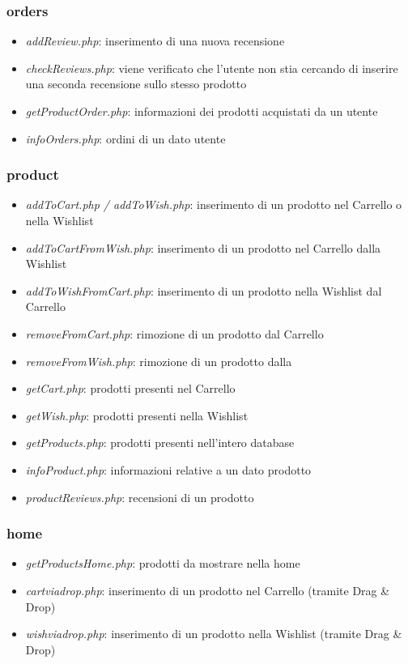 \documentclass[14pt]{extarticle}
\begin{document}
\subsubsection*{orders}
\begin{itemize}
    \item \textit{addReview.php}: inserimento di una nuova recensione
    \item \textit{checkReviews.php}: viene verificato che l'utente non stia cercando di inserire una seconda
    recensione sullo stesso prodotto
    \item \textit{getProductOrder.php}: informazioni dei prodotti acquistati da un utente
    \item \textit{infoOrders.php}: ordini di un dato utente
\end{itemize}

\subsubsection*{product}
\begin{itemize}
    \item \textit{addToCart.php / addToWish.php}: inserimento di un prodotto nel Carrello o nella Wishlist
    \item \textit{addToCartFromWish.php}: inserimento di un prodotto nel Carrello dalla Wishlist
    \item \textit{addToWishFromCart.php}: inserimento di un prodotto nella Wishlist dal Carrello
    \item \textit{removeFromCart.php}: rimozione di un prodotto dal Carrello
    \item \textit{removeFromWish.php}: rimozione di un prodotto dalla
    \item \textit{getCart.php}: prodotti presenti nel Carrello
    \item \textit{getWish.php}: prodotti presenti nella Wishlist
    \item \textit{getProducts.php}: prodotti presenti nell'intero database
    \item \textit{infoProduct.php}: informazioni relative a un dato prodotto
    \item \textit{productReviews.php}: recensioni di un prodotto
\end{itemize}

\subsubsection*{home}
\begin{itemize}
    \item \textit{getProductsHome.php}: prodotti da mostrare nella home
    \item \textit{cartviadrop.php}: inserimento di un prodotto nel Carrello (tramite Drag \& Drop)
    \item \textit{wishviadrop.php}: inserimento di un prodotto nella Wishlist (tramite Drag \& Drop)
\end{itemize}
\end{document}
